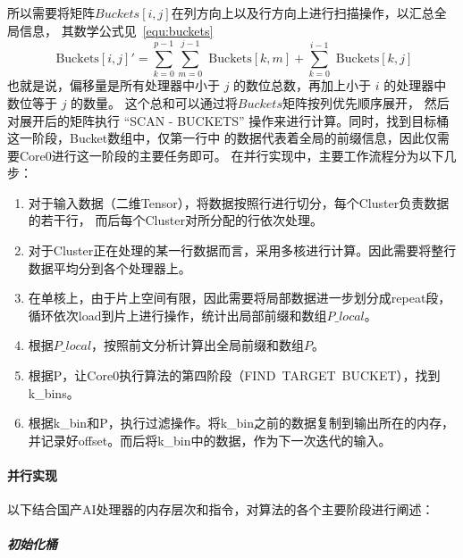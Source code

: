 所以需要将矩阵\(Buckets[i, j]\)在列方向上以及行方向上进行扫描操作，以汇总全局信息，
其数学公式见~\ref{equ:buckets}
\begin{equation}
    \text{ Buckets}[i, j]' = \sum_{k = 0}^{p - 1} \sum_{m = 0}^{j - 1} \text{ Buckets}[k, m] + \sum_{k = 0}^{i - 1} \text{ Buckets}[k, j]
    \label{equ:buckets}
\end{equation}
也就是说，偏移量是所有处理器中小于 $j$ 的数位总数，再加上小于 $i$ 的处理器中数位等于 $j$ 的数量。
这个总和可以通过将$Buckets$矩阵按列优先顺序展开，
然后对展开后的矩阵执行 “SCAN - BUCKETS” 操作来进行计算。同时，找到目标桶这一阶段，Bucket数组中，仅第一行中
的数据代表着全局的前缀信息，因此仅需要Core0进行这一阶段的主要任务即可。
在并行实现中，主要工作流程分为以下几步：
\begin{enumerate}
    \item 对于输入数据（二维Tensor），将数据按照行进行切分，每个Cluster负责数据的若干行，
    而后每个Cluster对所分配的行依次处理。
    \item 对于Cluster正在处理的某一行数据而言，采用多核进行计算。因此需要将整行数据平均分到各个处理器上。
    \item 在单核上，由于片上空间有限，因此需要将局部数据进一步划分成repeat段，循环依次load到片上进行操作，统计出局部前缀和数组\(P\_local\)。
    \item 根据\(P\_local\)，按照前文分析计算出全局前缀和数组\(P\)。
    \item 根据P，让Core0执行算法的第四阶段（FIND\ TARGET\ BUCKET），找到k\_bins。
    \item 根据k\_bin和P，执行过滤操作。将k\_bin之前的数据复制到输出所在的内存，并记录好offset。而后将k\_bin中的数据，作为下一次迭代的输入。
\end{enumerate}

\paragraph{并行实现}
以下结合国产AI处理器的内存层次和指令，对算法的各个主要阶段进行阐述：
\subparagraph{初始化桶}

